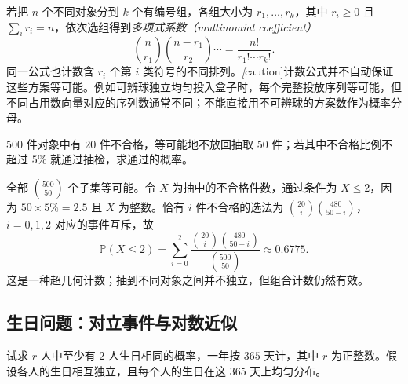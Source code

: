 若把 $n$ 个不同对象分到 $k$ 个有编号组，各组大小为 $r_1,\ldots,r_k$，其中 $r_i\ge0$ 且 $\sum_i r_i=n$，依次选组得到\emph{多项式系数（multinomial coefficient）}
\[
 \binom{n}{r_1}\binom{n-r_1}{r_2}\cdots
 =\frac{n!}{r_1!\cdots r_k!}.
\]
同一公式也计数含 $r_i$ 个第 $i$ 类符号的不同排列。\emph[caution]{计数公式并不自动保证这些方案等可能。}例如可辨球独立均匀投入盒子时，每个完整投放序列等可能，但不同占用数向量对应的序列数通常不同；不能直接用不可辨球的方案数作为概率分母。

\begin{example}
\label{ex:study-thesis-sampling}
$500$ 件对象中有 $20$ 件不合格，等可能地不放回抽取 $50$ 件；若其中不合格比例不超过 $5\%$ 就通过抽检，求通过的概率。
\end{example}

\begin{solve}
全部 $\binom{500}{50}$ 个子集等可能。令 $X$ 为抽中的不合格件数，通过条件为 $X\le2$，因为 $50\times5\%=2.5$ 且 $X$ 为整数。恰有 $i$ 件不合格的选法为 $\binom{20}{i}\binom{480}{50-i}$，$i=0,1,2$ 对应的事件互斥，故
\[
 \mathbb P(X\le2)=\sum_{i=0}^{2}
 \frac{\binom{20}{i}\binom{480}{50-i}}{\binom{500}{50}}
 \approx0.6775.
\]
这是一种超几何计数；抽到不同对象之间并不独立，但组合计数仍然有效。
\end{solve}

\subsection{生日问题：对立事件与对数近似}
\label{subsec:study-birthday-problem}

\begin{example}
\label{ex:study-birthday}
试求 $r$ 人中至少有 $2$ 人生日相同的概率，一年按 $365$ 天计，其中 $r$ 为正整数。假设各人的生日相互独立，且每个人的生日在这 $365$ 天上均匀分布。
\end{example}

